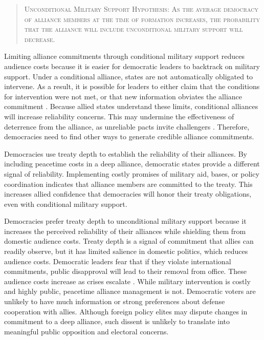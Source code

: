 \documentclass[12pt]{article}
\begin{document}
\begin{quote}
\textsc{Unconditional Military Support Hypothesis: As the average democracy of alliance members at the time of formation increases, the probability that the alliance will include unconditional military support will decrease.}
\end{quote} 


Limiting alliance commitments through conditional military support reduces audience costs because it is easier for democratic leaders to backtrack on military support. 
Under a conditional alliance, states are not automatically obligated to intervene. 
As a result, it is possible for leaders to either claim that the conditions for intervention were not met, or that new information obviates the alliance commitment \citep{LevenduskyHorowitz2012}. 
Because allied states understand these limits, conditional alliances will increase reliability concerns. 
This may undermine the effectiveness of deterrence from the alliance, as unreliable pacts invite challengers \citep{Smith1995}. 
Therefore, democracies need to find other ways to generate credible alliance commitments. 


Democracies use treaty depth to establish the reliability of their alliances.  
By including peacetime costs in a deep alliance, democratic states provide a different signal of reliability. 
Implementing costly promises of military aid, bases, or policy coordination indicates that alliance members are committed to the treaty. 
This increases allied confidence that democracies will honor their treaty obligations, even with conditional military support. 


Democracies prefer treaty depth to unconditional military support because it increases the perceived reliability of their alliances while shielding them from domestic audience costs. 
Treaty depth is a signal of commitment that allies can readily observe, but it has limited salience in domestic politics, which reduces audience costs. 
Democratic leaders fear that if they violate international commitments, public disapproval will lead to their removal from office. 
These audience costs increase as crises escalate \citep{Tomz2007}. 
While military intervention is costly and highly public, peacetime alliance management is not.  
Democratic voters are unlikely to have much information or strong preferences about defense cooperation with allies. 
Although foreign policy elites may dispute changes in commitment to a deep alliance, such dissent is unlikely to translate into meaningful public opposition and electoral concerns.
\end{document}
